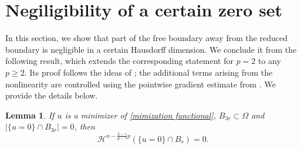 \documentclass[11pt, reqno]{amsart}
\newtheorem{lemma}{Lemma}
\numberwithin{equation}{section}
\numberwithin{theorem}{section}
\numberwithin{lemma}{section}
\numberwithin{corollary}{section}
\numberwithin{remark}{section}
\numberwithin{proposition}{section}
\numberwithin{definition}{section}
\begin{document}
\section{Negiligibility of a certain zero set}\label{s4}
In this section, we show that part of the free boundary away from the reduced boundary is negligible in a certain Hausdorff dimension. We conclude it from the following result, which extends the corresponding statement for $p=2$ to any $p\ge2$. Its proof follows the ideas of \cite[Lemma 3.1]{Ph83}; the additional terms arising from the nonlinearity are controlled using the pointwise gradient estimate from . We provide the details below.
\begin{lemma}\label{Hausdorff local}
    If $u$ is a minimizer of \eqref{mimization functional}, $B_{3r}\subset\Omega$ and $|\{u=0\}\cap B_{3r}|=0$, then
    \begin{equation}\label{step1}
        \mathcal{H}^{n-\frac{2-\gamma}{p-\gamma}p}\left(\{u=0\}\cap B_{r}\right)=0.
    \end{equation}
\end{lemma}
\end{document}
